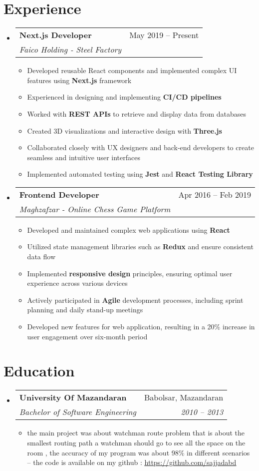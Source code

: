 \documentclass[a4paper,11pt]{article}
\makeatletter
\newcommand{\resumeItem}[1]{
  \item\small{#1}
}
\newcommand{\resumeItemListStart}{\begin{itemize}[rightmargin=0.11in]}
\newcommand{\resumeItemListEnd}{\end{itemize}}
\newcommand{\resumeQuadHeading}[4]{
  \item
  \begin{tabular*}{0.96\textwidth}[t]{l@{\extracolsep{\fill}}r}
    \textbf{#1} & #2 \\
    \textit{\small#3} & \textit{\small #4} \\
  \end{tabular*}
}
\newcommand{\resumeHeadingListStart}{
  \begin{itemize}[leftmargin=0.15in, label={}]
}
\newcommand{\resumeHeadingListEnd}{\end{itemize}}
\makeatother
\begin{document}

\section{Experience}
\resumeHeadingListStart{}
  \resumeQuadHeading{Next.js Developer}{May 2019 -- Present}
  {Faico Holding - Steel Factory}{}
    \resumeItemListStart{}
      \resumeItem{Developed reusable React components and implemented complex UI features using \textbf{Next.js} framework}
      \resumeItem{Experienced in designing and implementing \textbf{CI/CD pipelines} }
            \resumeItem{Worked with \textbf{REST APIs} to retrieve and display data from databases}
      \resumeItem{Created 3D visualizations and interactive design with \textbf{Three.js}}
      \resumeItem{Collaborated closely with UX designers and back-end developers to create seamless and intuitive user interfaces}
      \resumeItem{Implemented automated testing using \textbf{Jest} and \textbf{React Testing Library}}
    \resumeItemListEnd{}

  \resumeQuadHeading{Frontend Developer}{Apr 2016 -- Feb 2019}
  {Maghzafzar - Online Chess Game Platform}{}
    \resumeItemListStart{}
    	\resumeItem{Developed and maintained complex web applications using \textbf{React}}
	\resumeItem{Utilized state management libraries such as \textbf{Redux}  and ensure consistent data flow }
	\resumeItem{Implemented \textbf{responsive design} principles, ensuring optimal user experience across various devices}
    	 \resumeItem{Actively participated in \textbf{Agile} development processes, including sprint planning and daily stand-up meetings}
	\resumeItem{Developed new features for web application, resulting in a 20\% increase in user engagement over six-month period}
    \resumeItemListEnd{}


\resumeHeadingListEnd{}



\section{Education}
  \resumeHeadingListStart{}
    \resumeQuadHeading{University Of Mazandaran}{Babolsar, Mazandaran}
    {Bachelor of Software Engineering}{2010 – 2013}
	\begin{itemize}
	\item the main project was about watchman route problem that is about the smallest routing path a watchman should go to see all the space on the room , the accuracy of my program was about 98\% in different scenarios – the code is available on my github : \href{https://github.com/sajjadabd}{\uline{https://github.com/sajjadabd}}
	\end{itemize}
  \resumeHeadingListEnd{}
\end{document}
